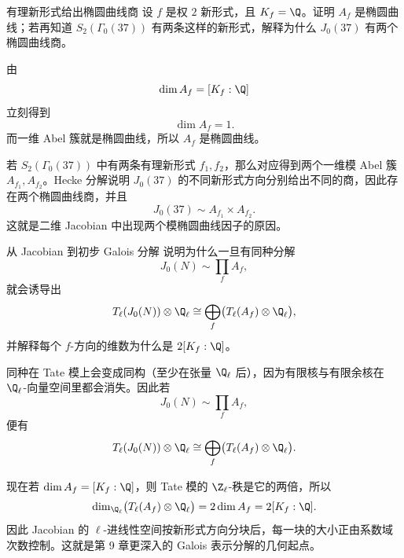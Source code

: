 \begin{problem}{有理新形式给出椭圆曲线商}
\hard
设 $f$ 是权 $2$ 新形式，且 $K_f=\Q$。证明 $A_f$ 是椭圆曲线；若再知道 $S_2(\Gamma_0(37))$ 有两条这样的新形式，解释为什么 $J_0(37)$ 有两个椭圆曲线商。
\end{problem}
\begin{solution}
由
\[
\dim A_f=[K_f:\Q]
\]
立刻得到
\[
\dim A_f=1.
\]
而一维 Abel 簇就是椭圆曲线，所以 $A_f$ 是椭圆曲线。

若 $S_2(\Gamma_0(37))$ 中有两条有理新形式 $f_1,f_2$，那么对应得到两个一维模 Abel 簇 $A_{f_1},A_{f_2}$。Hecke 分解说明 $J_0(37)$ 的不同新形式方向分别给出不同的商，因此存在两个椭圆曲线商，并且
\[
J_0(37)\sim A_{f_1}\times A_{f_2}.
\]
这就是二维 Jacobian 中出现两个模椭圆曲线因子的原因。
\end{solution}

\begin{problem}{从 Jacobian 到初步 Galois 分解}
\hard
说明为什么一旦有同种分解
\[
J_0(N)\sim \prod_f A_f,
\]
就会诱导出
\[
T_\ell(J_0(N))\otimes \Q_\ell \cong \bigoplus_f \bigl(T_\ell(A_f)\otimes \Q_\ell\bigr),
\]
并解释每个 $f$-方向的维数为什么是 $2[K_f:\Q]$。
\end{problem}
\begin{solution}
同种在 Tate 模上会变成同构（至少在张量 $\Q_\ell$ 后），因为有限核与有限余核在 $\Q_\ell$-向量空间里都会消失。因此若
\[
J_0(N)\sim \prod_f A_f,
\]
便有
\[
T_\ell(J_0(N))\otimes \Q_\ell \cong \bigoplus_f \bigl(T_\ell(A_f)\otimes \Q_\ell\bigr).
\]

现在若 $\dim A_f=[K_f:\Q]$，则 Tate 模的 $\Z_\ell$-秩是它的两倍，所以
\[
\dim_{\Q_\ell}\bigl(T_\ell(A_f)\otimes \Q_\ell\bigr)=2\dim A_f=2[K_f:\Q].
\]
因此 Jacobian 的 $\ell$-进线性空间按新形式方向分块后，每一块的大小正由系数域次数控制。这就是第 9 章更深入的 Galois 表示分解的几何起点。
\end{solution}

